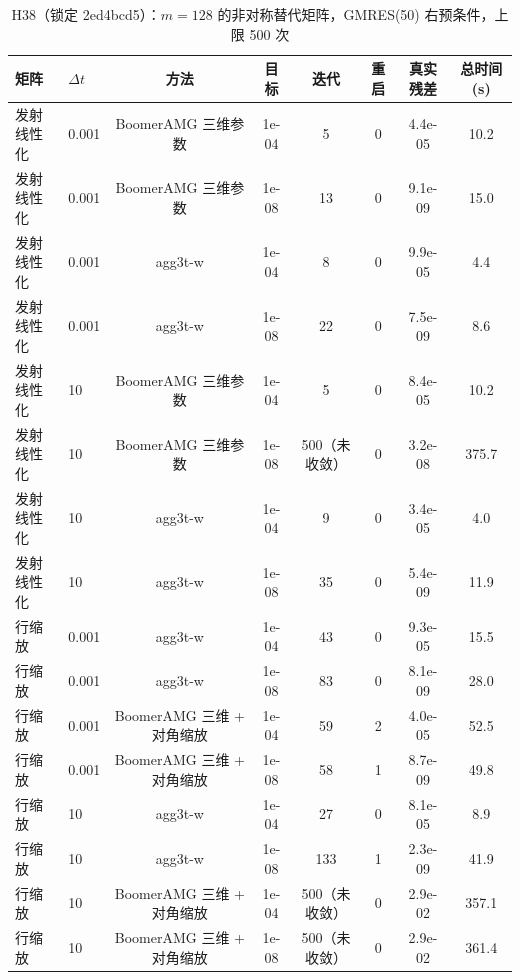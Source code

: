\begin{table}[H]\centering\small
\caption{H38（锁定 2ed4bcd5）：$m=128$ 的非对称替代矩阵，GMRES(50) 右预条件，上限 500 次}\label{tab:h38}
\begin{tabular}{llcccccc}
\toprule
矩阵 & $\Delta t$ & 方法 & 目标 & 迭代 & 重启 & 真实残差 & 总时间 (s) \\
\midrule
发射线性化 & 0.001 & BoomerAMG 三维参数 & 1e-04 & 5 & 0 & 4.4e-05 & 10.2 \\
发射线性化 & 0.001 & BoomerAMG 三维参数 & 1e-08 & 13 & 0 & 9.1e-09 & 15.0 \\
发射线性化 & 0.001 & agg3t-w & 1e-04 & 8 & 0 & 9.9e-05 & 4.4 \\
发射线性化 & 0.001 & agg3t-w & 1e-08 & 22 & 0 & 7.5e-09 & 8.6 \\
发射线性化 & 10 & BoomerAMG 三维参数 & 1e-04 & 5 & 0 & 8.4e-05 & 10.2 \\
发射线性化 & 10 & BoomerAMG 三维参数 & 1e-08 & 500（未收敛） & 0 & 3.2e-08 & 375.7 \\
发射线性化 & 10 & agg3t-w & 1e-04 & 9 & 0 & 3.4e-05 & 4.0 \\
发射线性化 & 10 & agg3t-w & 1e-08 & 35 & 0 & 5.4e-09 & 11.9 \\
行缩放 & 0.001 & agg3t-w & 1e-04 & 43 & 0 & 9.3e-05 & 15.5 \\
行缩放 & 0.001 & agg3t-w & 1e-08 & 83 & 0 & 8.1e-09 & 28.0 \\
行缩放 & 0.001 & BoomerAMG 三维 + 对角缩放 & 1e-04 & 59 & 2 & 4.0e-05 & 52.5 \\
行缩放 & 0.001 & BoomerAMG 三维 + 对角缩放 & 1e-08 & 58 & 1 & 8.7e-09 & 49.8 \\
行缩放 & 10 & agg3t-w & 1e-04 & 27 & 0 & 8.1e-05 & 8.9 \\
行缩放 & 10 & agg3t-w & 1e-08 & 133 & 1 & 2.3e-09 & 41.9 \\
行缩放 & 10 & BoomerAMG 三维 + 对角缩放 & 1e-04 & 500（未收敛） & 0 & 2.9e-02 & 357.1 \\
行缩放 & 10 & BoomerAMG 三维 + 对角缩放 & 1e-08 & 500（未收敛） & 0 & 2.9e-02 & 361.4 \\
\bottomrule
\end{tabular}
\end{table}